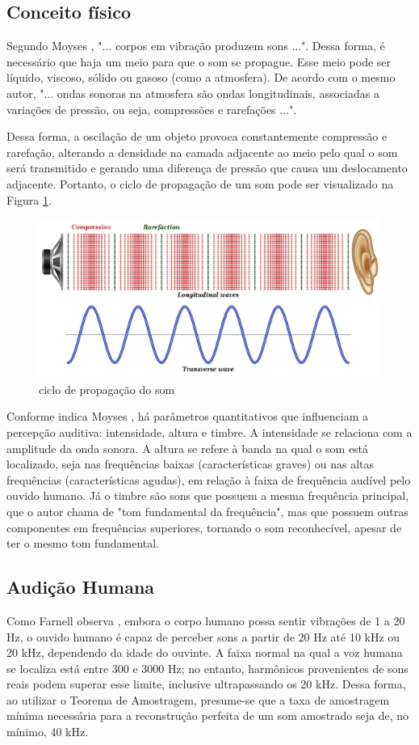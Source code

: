 \subsection{Conceito físico}
Segundo Moyses \cite{moyses}, "... corpos em vibração produzem sons ...". Dessa forma, é necessário que haja um meio para que o som se propague. Esse meio pode ser líquido, viscoso, sólido ou gasoso (como a atmosfera). De acordo com o mesmo autor, "... ondas sonoras na atmosfera são ondas longitudinais, associadas a variações de pressão, ou seja, compressões e rarefações ...". \par Dessa forma, a oscilação de um objeto provoca constantemente compressão e rarefação, alterando a densidade na camada adjacente ao meio pelo qual o som será transmitido e gerando uma diferença de pressão que causa um deslocamento adjacente. Portanto, o ciclo de propagação de um som pode ser visualizado na Figura \ref{fig07}.

\begin{figure}[h]
	\centering
    \includegraphics[scale=0.6]{figuras/fig07.png}
	\caption{ciclo de propagação do som \cite{shutterstock}}
	\label{fig07}
\end{figure}

Conforme indica Moyses \cite{moyses}, há parâmetros quantitativos que influenciam a percepção auditiva: intensidade, altura e timbre. A intensidade se relaciona com a amplitude da onda sonora. A altura se refere à banda na qual o som está localizado, seja nas frequências baixas (características graves) ou nas altas frequências (características agudas), em relação à faixa de frequência audível pelo ouvido humano. Já o timbre são sons que possuem a mesma frequência principal, que o autor chama de "tom fundamental da frequência", mas que possuem outras componentes em frequências superiores, tornando o som reconhecível, apesar de ter o mesmo tom fundamental.

\subsection{Audição Humana}
Como Farnell observa \cite{farnell}, embora o corpo humano possa sentir vibrações de 1 a 20 Hz, o ouvido humano é capaz de perceber sons a partir de 20 Hz até 10 kHz ou 20 kHz, dependendo da idade do ouvinte. A faixa normal na qual a voz humana se localiza está entre 300 e 3000 Hz; no entanto, harmônicos provenientes de sons reais podem superar esse limite, inclusive ultrapassando os 20 kHz. Dessa forma, ao utilizar o Teorema de Amostragem, presume-se que a taxa de amostragem mínima necessária para a reconstrução perfeita de um som amostrado seja de, no mínimo, 40 kHz.


